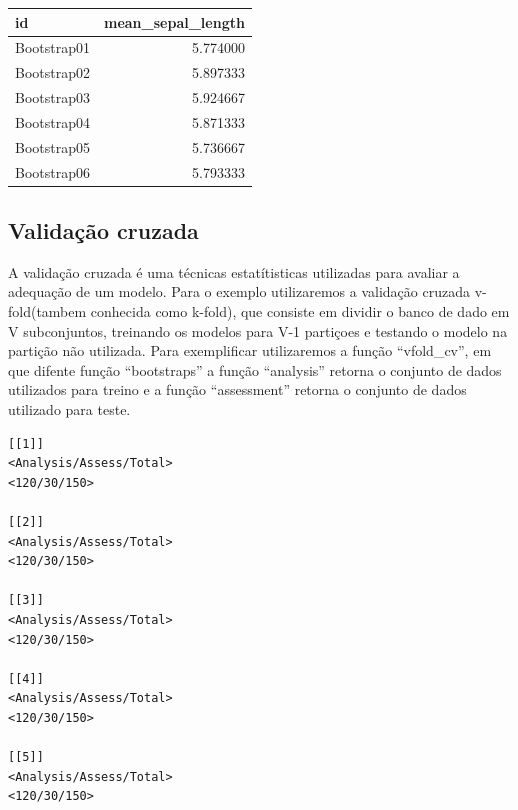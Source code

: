 \documentclass[
  a4paperpaper,
]{article}
\newenvironment{Shaded}{\begin{snugshade}}{\end{snugshade}}
\newcommand{\AttributeTok}[1]{\textcolor[rgb]{0.40,0.45,0.13}{#1}}
\newcommand{\DecValTok}[1]{\textcolor[rgb]{0.68,0.00,0.00}{#1}}
\newcommand{\FunctionTok}[1]{\textcolor[rgb]{0.28,0.35,0.67}{#1}}
\newcommand{\NormalTok}[1]{\textcolor[rgb]{0.00,0.23,0.31}{#1}}
\newcommand{\OtherTok}[1]{\textcolor[rgb]{0.00,0.23,0.31}{#1}}
\newcommand{\SpecialCharTok}[1]{\textcolor[rgb]{0.37,0.37,0.37}{#1}}
\begin{document}
\begin{longtable}[]{@{}lr@{}}
\toprule\noalign{}
id & mean\_sepal\_length \\
\midrule\noalign{}
\endhead
\bottomrule\noalign{}
\endlastfoot
Bootstrap01 & 5.774000 \\
Bootstrap02 & 5.897333 \\
Bootstrap03 & 5.924667 \\
Bootstrap04 & 5.871333 \\
Bootstrap05 & 5.736667 \\
Bootstrap06 & 5.793333 \\
\end{longtable}

\subsection{Validação cruzada}\label{validauxe7uxe3o-cruzada}

A validação cruzada é uma técnicas estatítisticas utilizadas para
avaliar a adequação de um modelo. Para o exemplo utilizaremos a
validação cruzada v-fold(tambem conhecida como k-fold), que consiste em
dividir o banco de dado em V subconjuntos, treinando os modelos para V-1
partiçoes e testando o modelo na partição não utilizada. Para
exemplificar utilizaremos a função ``vfold\_cv'', em que difente função
``bootstraps'' a função ``analysis'' retorna o conjunto de dados
utilizados para treino e a função ``assessment'' retorna o conjunto de
dados utilizado para teste.

\begin{Shaded}
\end{Shaded}

\begin{verbatim}
[[1]]
<Analysis/Assess/Total>
<120/30/150>

[[2]]
<Analysis/Assess/Total>
<120/30/150>

[[3]]
<Analysis/Assess/Total>
<120/30/150>

[[4]]
<Analysis/Assess/Total>
<120/30/150>

[[5]]
<Analysis/Assess/Total>
<120/30/150>
\end{verbatim}
\end{document}
